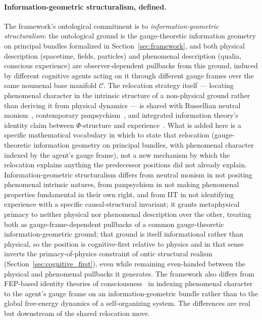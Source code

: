 \documentclass[11pt]{article}
\begin{document}
\paragraph{Information-geometric structuralism, defined.}
The framework's ontological commitment is to \emph{information-geometric structuralism}: the ontological ground is the gauge-theoretic information geometry on principal bundles formalized in Section~\ref{sec:framework}, and both physical description (spacetime, fields, particles) and phenomenal description (qualia, conscious experience) are observer-dependent pullbacks from this ground, induced by different cognitive agents acting on it through different gauge frames over the same noumenal base manifold $\mathcal{C}$. The relocation strategy itself — locating phenomenal character in the intrinsic structure of a non-physical ground rather than deriving it from physical dynamics — is shared with Russellian neutral monism~\cite{Russell1927, Strawson2006}, contemporary panpsychism~\cite{Goff2017, Chalmers2013consciousness}, and integrated information theory's identity claim between $\Phi$-structure and experience~\cite{Tononi2008, Tononi2015}. What is added here is a specific mathematical vocabulary in which to state that relocation (gauge-theoretic information geometry on principal bundles, with phenomenal character indexed by the agent's gauge frame), not a new mechanism by which the relocation explains anything the predecessor positions did not already explain. Information-geometric structuralism differs from neutral monism in not positing phenomenal intrinsic natures, from panpsychism in not making phenomenal properties fundamental in their own right, and from IIT in not identifying experience with a specific causal-structural invariant; it grants metaphysical primacy to neither physical nor phenomenal description over the other, treating both as gauge-frame-dependent pullbacks of a common gauge-theoretic information-geometric ground; that ground is itself informational rather than physical, so the position is cognitive-first relative to physics and in that sense inverts the primacy-of-physics constraint of ontic structural realism (Section~\ref{sec:cognitive_first}), even while remaining even-handed between the physical and phenomenal pullbacks it generates. The framework also differs from FEP-based identity theories of consciousness~\cite{Solms2021, Friston2018, Hohwy2022} in indexing phenomenal character to the agent's gauge frame on an information-geometric bundle rather than to the global free-energy dynamics of a self-organizing system. The differences are real but downstream of the shared relocation move.
\end{document}
